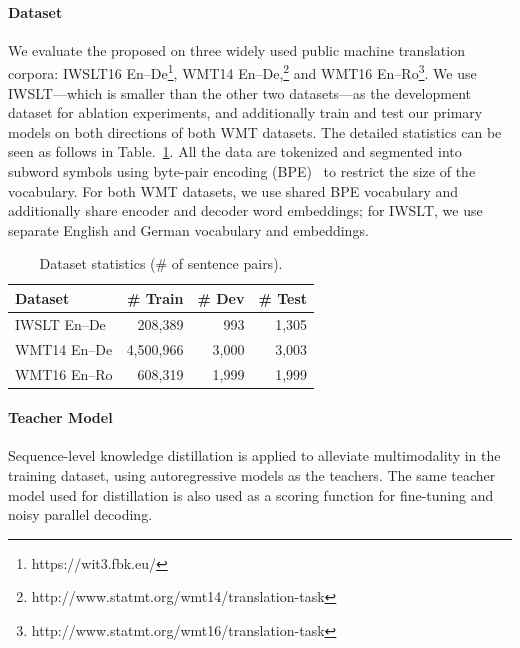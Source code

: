 \paragraph{Dataset} We evaluate the proposed \model{} on three widely used public machine translation corpora: IWSLT16 En--De\footnote{https://wit3.fbk.eu/}, WMT14 En--De,\footnote{http://www.statmt.org/wmt14/translation-task} and WMT16 En--Ro\footnote{http://www.statmt.org/wmt16/translation-task}. We use IWSLT---which is smaller than the other two datasets---as the development dataset for ablation experiments, and additionally train and test our primary models on both directions of both WMT datasets. The detailed statistics can be seen as follows in Table.~\ref{cp8.table.dataset}.
All the data are tokenized and segmented into subword symbols using byte-pair encoding (BPE)~\citep{sennrich2015neural} to restrict the size of the vocabulary. For both WMT datasets, we use shared BPE vocabulary and additionally share encoder and decoder word embeddings; for IWSLT, we use separate English and German vocabulary and embeddings.

 \begin{table}[hptb]
 \small
 \centering
 \begin{tabular}{l|r|r|r}
 \toprule
  Dataset& \# Train & \# Dev & \# Test\\
 \midrule
 IWSLT En--De & 208,389 & 993 & 1,305 \\
 WMT14 En--De & 4,500,966 & 3,000 & 3,003 \\
 WMT16 En--Ro & 608,319 & 1,999 & 1,999 \\
 \bottomrule
 \end{tabular} 
 \caption{\label{cp8.table.dataset} Dataset statistics (\# of sentence pairs).}
 \end{table}   

\paragraph{Teacher Model} Sequence-level knowledge distillation is applied to alleviate multimodality in the training dataset, using autoregressive models as the teachers. The same teacher model used for distillation is also used as a scoring function for fine-tuning and noisy parallel decoding.

